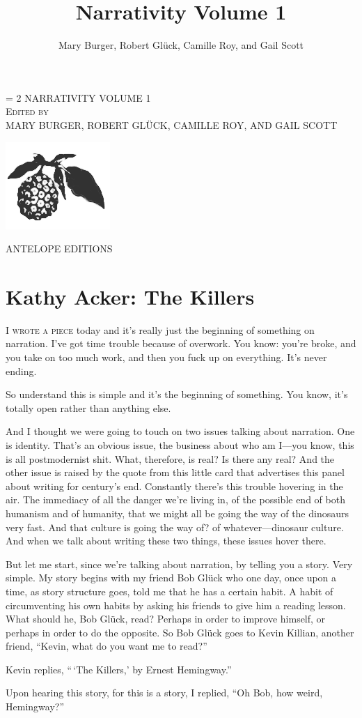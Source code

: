 \documentclass[
]{memoir}
\title{Narrativity Volume 1}
\author{Mary Burger, Robert Glück, Camille Roy, and Gail Scott}
\date{}
\newlength{\drop}%
\newcommand*{\titleWH}{\begingroup%
\drop = 2\baselineskip
\centering
\vspace*{\drop}
\settowidth{\unitlength}{\Huge\uppercase{Narrativity Volume 1}}
\vspace*{\baselineskip}
{\Huge\color{red} \uppercase{Narrativity Volume 1}}\\[\drop]
{\Large\scshape Edited by}\\[\drop]
{\Large\uppercase{Mary Burger, Robert Glück, Camille Roy, and Gail Scott}}\\[\baselineskip]
\vspace*{\drop}
\begin{center} \includegraphics{images/pandanus.png} \end{center}
\vspace*{\drop}
{\Large ANTELOPE EDITIONS}\\
{\scshape \the\year{}}\par
\vspace*{\drop}
\endgroup}
\begin{document}
\titleWH


\frontmatter


\setcounter{tocdepth}{0}
\tableofcontents



\mainmatter

\hypertarget{kathy-acker-the-killers}{%
\chapter{Kathy Acker: The Killers}\label{kathy-acker-the-killers}}

\lettrine[lines=3, findent=0em, nindent=0.1em, lhang=0]{I}{ wrote a piece}
today and it's really just the beginning of something on narration. I've
got time trouble because of overwork. You know: you're broke, and you
take on too much work, and then you fuck up on everything. It's never
ending.

So understand this is simple and it's the beginning of something. You
know, it's totally open rather than anything else.

And I thought we were going to touch on two issues talking about
narration. One is identity. That's an obvious issue, the business about
who am I---you know, this is all postmodernist shit. What, therefore, is
real? Is there any real? And the other issue is raised by the quote from
this little card that advertises this panel about writing for century's
end. Constantly there's this trouble hovering in the air. The immediacy
of all the danger we're living in, of the possible end of both humanism
and of humanity, that we might all be going the way of the dinosaurs
very fast. And that culture is going the way of? of whatever---dinosaur
culture. And when we talk about writing these two things, these issues
hover there.

But let me start, since we're talking about narration, by telling you a
story. Very simple. My story begins with my friend Bob Glück who one
day, once upon a time, as story structure goes, told me that he has a
certain habit. A habit of circumventing his own habits by asking his
friends to give him a reading lesson. What should he, Bob Glück, read?
Perhaps in order to improve himself, or perhaps in order to do the
opposite. So Bob Glück goes to Kevin Killian, another friend, ``Kevin,
what do you want me to read?''

Kevin replies, ``\,`The Killers,' by Ernest Hemingway.''

Upon hearing this story, for this is a story, I replied, ``Oh Bob, how
weird, Hemingway?''
\end{document}
